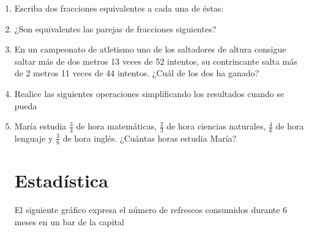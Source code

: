 \documentclass[10pt,twoside]{article}
\begin{document}
\begin{enumerate}
\begin{enumerate}
\end{enumerate}
\item Escriba dos fracciones equivalentes a cada una de éstas:
\begin{enumerate}
\end{enumerate}
\item ¿Son equivalentes las parejas de fracciones siguientes?
\begin{enumerate}
\end{enumerate}
\item En un campeonato de atletismo uno de los saltadores de altura consigue saltar más de dos metros 13 veces de 52 intentos, su contrincante salta m\'{a}s de 2 metros 11 veces de 44 intentos. ¿Cu\'{a}l de los dos ha ganado?
\item Realice las siguientes operaciones simplificando los resultados cuando se pueda
\begin{enumerate}
\end{enumerate}
\item María estudia $\frac{3}{4}$ de hora matemáticas, $\frac{2}{3}$ de hora ciencias naturales, $\frac{4}{6}$ de hora lenguaje y $\frac{3}{8}$ de hora inglés. ¿Cuántas horas estudia María?
\section*{Estad\'{i}stica}
\begin{minipage}{.45\textwidth}
El siguiente gr\'{a}fico expresa el n\'{u}mero de refrescos consumidos durante 6 meses en un bar de la capital
\end{minipage} \hfill
\begin{minipage}{.45\textwidth}

\end{minipage}
\end{enumerate}
\end{document}
